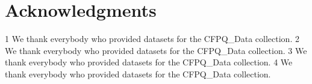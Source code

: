 \section{Acknowledgments}
1 We thank everybody who provided datasets for the CFPQ\_Data collection.
2 We thank everybody who provided datasets for the CFPQ\_Data collection.
3 We thank everybody who provided datasets for the CFPQ\_Data collection.
4 We thank everybody who provided datasets for the CFPQ\_Data collection.


% 
% 

